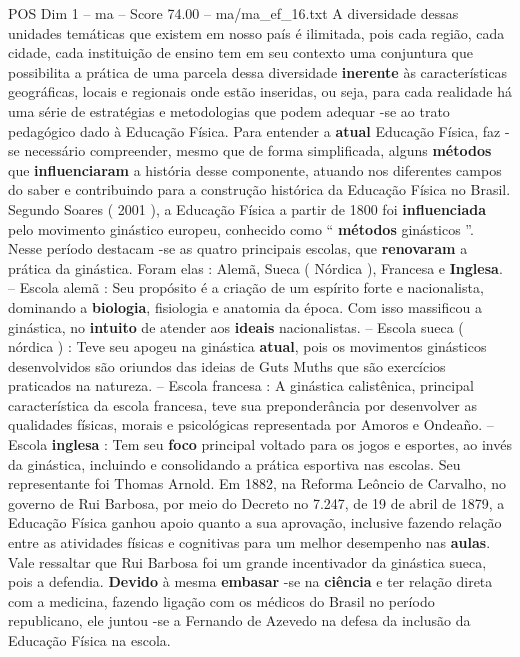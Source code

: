 \begin{textsample}{POS Dim 1 – ma – Score 74.00 – ma/ma\_ef\_16.txt}
A diversidade dessas unidades temáticas que existem em nosso país é ilimitada, pois cada região, cada cidade, cada instituição de ensino tem em seu contexto uma conjuntura que possibilita a prática de uma parcela dessa diversidade \textbf{inerente} às características geográficas, locais e regionais onde estão inseridas, ou seja, para cada realidade há uma série de estratégias e metodologias que podem adequar -se ao trato pedagógico dado à Educação Física.
Para entender a \textbf{atual} Educação Física, faz -se necessário compreender, mesmo que de forma simplificada, alguns \textbf{métodos} que \textbf{influenciaram} a história desse componente, atuando nos diferentes campos do saber e contribuindo para a construção histórica da Educação Física no Brasil.
Segundo Soares ( 2001 ), a Educação Física a partir de 1800 foi \textbf{influenciada} pelo movimento ginástico europeu, conhecido como “ \textbf{métodos} ginásticos ”.
Nesse período destacam -se as quatro principais escolas, que \textbf{renovaram} a prática da ginástica.
Foram elas : Alemã, Sueca ( Nórdica ), Francesa e \textbf{Inglesa}. – Escola alemã : Seu propósito é a criação de um espírito forte e nacionalista, dominando a \textbf{biologia}, fisiologia e anatomia da época.
Com isso massificou a ginástica, no \textbf{intuito} de atender aos \textbf{ideais} nacionalistas. – Escola sueca ( nórdica ) : Teve seu apogeu na ginástica \textbf{atual}, pois os movimentos ginásticos desenvolvidos são oriundos das ideias de Guts Muths que são exercícios praticados na natureza. – Escola francesa : A ginástica calistênica, principal característica da escola francesa, teve sua preponderância por desenvolver as qualidades físicas, morais e psicológicas representada por Amoros e Ondeaño. – Escola \textbf{inglesa} : Tem seu \textbf{foco} principal voltado para os jogos e esportes, ao invés da ginástica, incluindo e consolidando a prática esportiva nas escolas.
Seu representante foi Thomas Arnold.
Em 1882, na Reforma Leôncio de Carvalho, no governo de Rui Barbosa, por meio do Decreto no 7.247, de 19 de abril de 1879, a Educação Física ganhou apoio quanto a sua aprovação, inclusive fazendo relação entre as atividades físicas e cognitivas para um melhor desempenho nas \textbf{aulas}.
Vale ressaltar que Rui Barbosa foi um grande incentivador da ginástica sueca, pois a defendia. \textbf{Devido} à mesma \textbf{embasar} -se na \textbf{ciência} e ter relação direta com a medicina, fazendo ligação com os médicos do Brasil no período republicano, ele juntou -se a Fernando de Azevedo na defesa da inclusão da Educação Física na escola.

\end{textsample}
